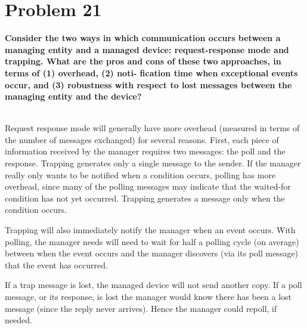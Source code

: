 \documentclass[11pt]{article}
\begin{document}
\newpage
\section{Problem 21}

\textbf{Consider the two ways in which communication occurs between a managing entity and a managed device: request-response mode and trapping. What are the pros and cons of these two approaches, in terms of (1) overhead, (2) noti- fication time when exceptional events occur, and (3) robustness with respect to lost messages between the managing entity and the device?}


~\\

Request response mode will generally have more overhead (measured in terms of the number of messages exchanged) for several reasons. First, each piece of information received by the manager requires two messages: the poll and the response. Trapping generates only a single message to the sender. If the manager really only wants to be notified when a condition occurs, polling has more overhead, since many of the polling messages may indicate that the waited-for condition has not yet occurred. Trapping generates a message only when the condition occurs.

Trapping will also immediately notify the manager when an event occurs. With polling, the manager needs will need to wait for half a polling cycle (on average) between when the event occurs and the manager discovers (via its poll message) that the event has occurred.

If a trap message is lost, the managed device will not send another copy. If a poll message, or its response, is lost the manager would know there has been a lost message (since the reply never arrives). Hence the manager could repoll, if needed.
\end{document}
